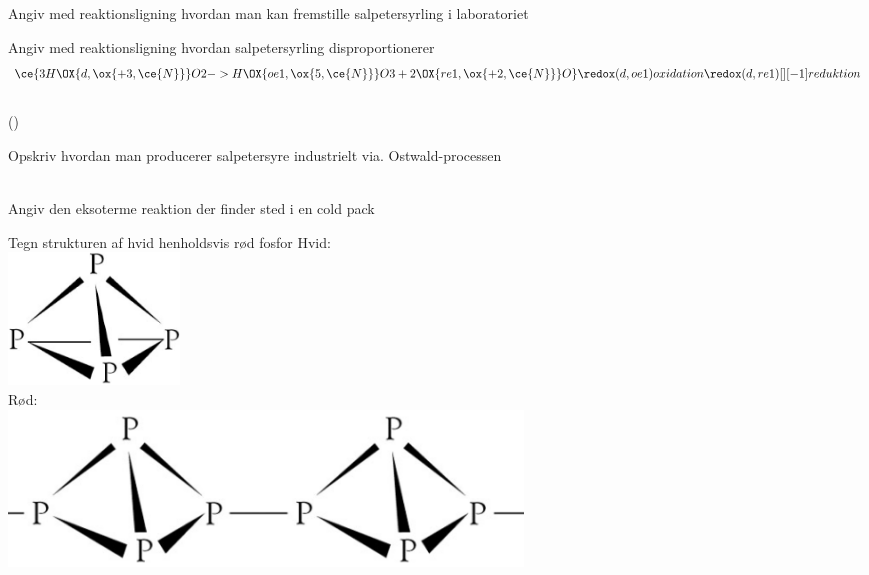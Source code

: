 \begin{flashcard}[Fremstilling]{Angiv med reaktionsligning hvordan man kan fremstille salpetersyrling i laboratoriet}
\end{flashcard}

\begin{flashcard}[Reaktion]{Angiv med reaktionsligning hvordan salpetersyrling disproportionerer}
\begin{align*}
\ce{3H\OX{d,\ox{+3,\ce{N}}}O2 -> H\OX{oe1,\ox{5,\ce{N}}}O3 + 2\OX{re1,\ox{+2,\ce{N}}}O}
\redox(d,oe1){\small oxidation}
\redox(d,re1)[][-1]{\small reduktion}
\end{align*}\\ \vspace{15pt}
()
\end{flashcard}

\begin{flashcard}[Fremstilling]{Opskriv hvordan man producerer salpetersyre industrielt via. Ostwald-processen}
\\
\\
\end{flashcard}

\begin{flashcard}[Anvendelse]{Angiv den eksoterme reaktion der finder sted i en cold pack}
\end{flashcard}

\begin{flashcard}[Struktur]{Tegn strukturen af hvid henholdsvis rød fosfor}
Hvid:\\
\includegraphics[width=0.2\textwidth]{figures/k15s390HvidP.png}\\
Rød:\\
\includegraphics[width=0.6\textwidth]{figures/k15s390RodP.png}
\end{flashcard}

